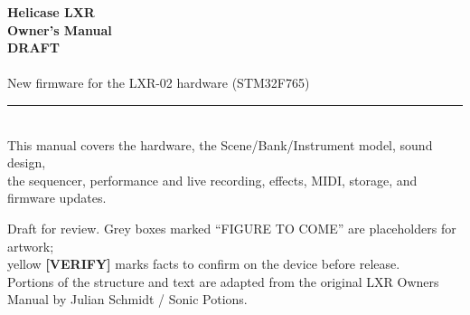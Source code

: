 
\begin{titlepage}
  \centering
  \vspace*{3cm}

  {\Huge\bfseries\color{lxrorange} Helicase LXR}\\[0.4em]
  {\LARGE\bfseries Owner's Manual}\\[1em]
  {\Large\bfseries\color{verifyfg} DRAFT}\\[2em]

  {\large\color{lxrgrey} \manualversion}\\[0.5em]
  {\normalsize\color{lxrgrey} New firmware for the LXR-02 hardware (STM32F765)}\\[4cm]

  \textcolor{lxrorange}{\rule{0.6\linewidth}{1.5pt}}\\[3em]

  {\normalsize\color{lxrgrey}
    This manual covers the hardware, the Scene/Bank/Instrument model, sound design,\\
    the sequencer, performance and live recording, effects, MIDI, storage, and firmware updates.
  }

  \vfill

  {\small\color{lxrgrey}
    Draft for review. Grey boxes marked ``FIGURE TO COME'' are placeholders for artwork;\\
    yellow \textbf{[VERIFY]} marks facts to confirm on the device before release.\\[4pt]
    Portions of the structure and text are adapted from the original LXR Owners Manual by
    Julian Schmidt / Sonic Potions. 
  }
\end{titlepage}
